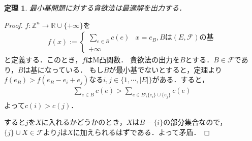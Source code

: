 \documentclass[a4paper]{jsarticle}
\newcommand{\abs}[1]{ \left| #1 \right| }
\newcommand{\Int}{\mathbb{Z}}
\theoremstyle{break}
\newtheorem{theo}{定理}[section]
\newtheorem{proof}{証明}[section]
\begin{document}
\begin{theo}
  最小基問題に対する貪欲法は最適解を出力する．
\end{theo}
\begin{proof}
  $f\colon\Int^n \to \mathbb{R}\cup \{+\infty\}$を
  \begin{align*}
    f(x) := \begin{cases}
      \sum_{e\in B}c(e) & x=e_B,Bは(E,\mathcal{F})の基 \\
      +\infty
    \end{cases}
  \end{align*}
  と定義する．このとき，$f$はM凸関数．
  貪欲法の出力を$B$とする．$B\in \mathcal{F}$であり，$B$は基になっている．
  もし$B$が最小基でないとすると，定理より$f(e_B)>f(e_B-e_i+e_j)$なる$i,j\in \{1,\cdots,\abs{E}\}$がある．すると，
  \begin{align*}
    \sum_{e\in B} c(e) > \sum_{e\in B \setminus \{e_i\}\cup \{e_j\}} c(e)
  \end{align*}
  よって$c(i) > c(j)$．

  すると$j$を$X$に入れるかどうかのとき，$X$は$B-\{i\}$の部分集合なので，$\{j\}\cup X \in \mathcal{F}$より$j$は$X$に加えられるはずである．よって矛盾．
\end{proof}
\end{document}
